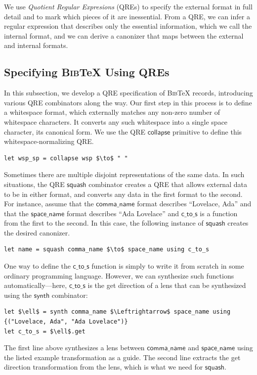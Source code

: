 \documentclass[acmsmall,screen]{acmart}
\newcommand{\codefont}[1]{\ensuremath{\mathsf{#1}}}
\newcommand{\kw}[1]{\textcolor{dkblue}{\ensuremath{\mathsf{#1}}}}
\newcommand{\bibtex}{\textsc{Bib}\TeX{}}
\begin{document}
We use {\em Quotient Regular Expresions} (QREs) to specify the
external format in full detail and to mark which pieces of it are
inessential.  From a QRE, we can infer a regular expression that
describes only the essential information, which we call the internal
format, and we can derive a canonizer that maps between the external
and internal formats.


\subsection{Specifying \bibtex{} Using QREs}
\label{subsec:qre-expressions}
In this subsection, we develop a QRE specification of \bibtex{}
records, introducing various QRE combinators along the way. 
Our first step in this process is to define a
whitespace format, which externally matches any non-zero number of whitespace
characters. It converts any such whitespace into a single space
character, its canonical form. 
We use the QRE \kw{collapse} primitive to define this
whitespace-normalizing QRE.

\begin{lstlisting}
let wsp_sp = collapse wsp $\to$ " "
\end{lstlisting}
\iflastminute
\fi

Sometimes there are multiple disjoint representations of the same data.
In such situations, the QRE \kw{squash} combinator creates a QRE that
allows external data to be in either format, and converts any
data in the first format to the second.
For instance, assume that
the \codefont{comma\_name} format describes ``Lovelace, Ada''
and that the \codefont{space\_name} format describes ``Ada Lovelace''
and \codefont{c\_to\_s} is a function from the first to the second.  In this
case, the following instance of \kw{squash} creates the desired canonizer.


\begin{lstlisting}
let name = squash comma_name $\to$ space_name using c_to_s
\end{lstlisting}

One way to define the \codefont{c\_to\_s} function
is simply to write it from scratch in some ordinary programming language.
However, we can synthesize such functions automatically---here, \codefont{c\_to\_s} is the
get direction of a lens that can be synthesized using the 
\kw{synth} combinator:
%
\begin{lstlisting}
let $\ell$ = synth comma_name $\Leftrightarrow$ space_name using {("Lovelace, Ada", "Ada Lovelace")}
let c_to_s = $\ell$.get 
\end{lstlisting}
\noindent
The first line above synthesizes a lens between \codefont{comma\_name} and
\codefont{space\_name} using the listed example transformation as a guide.  The
second line extracts the get direction transformation from the lens,
which is what we need for \kw{squash}.
\end{document}
